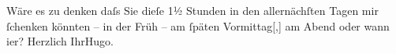 \pstart
           Wäre es zu denken daſs Sie dieſe 1½ Stunden in den allernächſten Tagen mir{ }ſchenken
               könnten – in der Früh – am{ }ſpäten Vormittag{[},{]} am Abend oder wann
                  i{\geminationm}er?\pend
           \pstart Herzlich Ihr\spacefill\mbox{Hugo.}\pend{}\endnumbering{}  \newcommand{\dateiname}{L02240}\newcommand{\titel}{Hugo von Hofmannsthal an Arthur Schnitzler, [25. 8. 1916]}\newcommand{\editorInnen}{Martin Anton Müller und Gerd-Hermann Susen}
